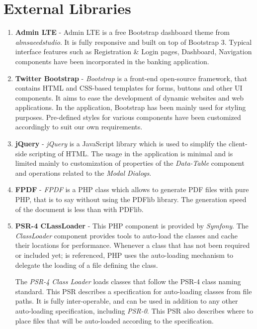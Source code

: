 \section{External Libraries} \label{section_libraries}

\begin{enumerate}
\item \textbf{Admin LTE} - Admin LTE is a free Bootstrap dashboard theme from \textit{almsaeedstudio}. It is fully responsive and built on top of Bootstrap 3. Typical interface features such as Registration \& Login pages, Dashboard, Navigation components have been incorporated in the banking application.  

\item \textbf{Twitter Bootstrap} - \textit{Bootstrap} is a front-end open-source framework, that contains HTML and CSS-based templates for forms, buttons and other UI components. It aims to ease the development of dynamic websites and web applications. In the application, Bootstrap has been mainly used for styling purposes. Pre-defined styles for various components have been customized accordingly to suit our own requirements.

\item \textbf{jQuery} - \textit{jQuery} is a JavaScript library which is used to simplify the client-side scripting of HTML. The usage in the application is minimal and is limited mainly to customization of properties of the \textit{Data-Table} component and operations related to the \textit{Modal Dialogs}.

\item \textbf{FPDF} - \textit{FPDF} is a PHP class which allows to generate PDF files with pure PHP, that is to say without using the PDFlib library. The generation speed of the document is less than with PDFlib. 

\item \textbf{PSR-4 CLassLoader} - This PHP component is provided by \textit{Symfony}. The \textit{ClassLoader} component provides tools to auto-load the classes and cache their locations for performance. Whenever a class that has not been required or included yet; is referenced, PHP uses the auto-loading mechanism to delegate the loading of a file defining the class.

The \textit{PSR-4 Class Loader}  loads classes that follow the PSR-4 class naming standard. 
This PSR describes a specification for auto-loading classes from file paths. It is fully inter-operable, and can be used in addition to any other auto-loading specification, including \textit{PSR-0}. This PSR also describes where to place files that will be auto-loaded according to the specification.

\end{enumerate}

\clearpage
